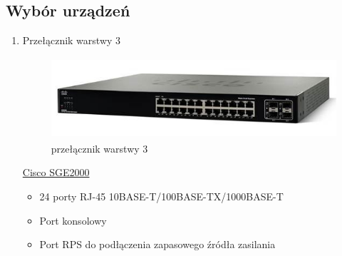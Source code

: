 \documentclass{article}
\begin{document}
\subsection{Wybór urządzeń}
\begin{enumerate}
	\item Przełącznik warstwy 3\newline
	\begin{figure}[!ht]	
		\centering
		\includegraphics[height=3cm]{1.jpg}
		\caption{przełącznik warstwy 3}
		\label{fig:obrazek 2}
	\end{figure}
	\href{https://www.cisco.com/c/en/us/products/collateral/switches/sge2000-24-port-gigabit-switch/data\_sheet\_c78-502447.html}{Cisco SGE2000}
	\begin{itemize}
		\item 24 porty RJ-45 10BASE-T/100BASE-TX/1000BASE-T
		\item Port konsolowy
		\item Port RPS do podłączenia zapasowego źródła zasilania
	\end{itemize}
	

\end{enumerate}
\end{document}
